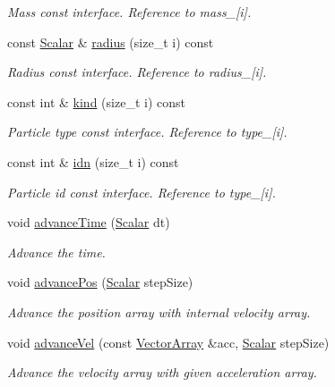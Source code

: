 \begin{DoxyCompactItemize}
\begin{DoxyCompactList}\small\item\em Mass const interface. Reference to mass\+\_\+\mbox{[}i\mbox{]}. \end{DoxyCompactList}\item 
const \mbox{\hyperlink{class_vel_indep_particles_a5d275b22f0d759f360ddd80e78f4b466}{Scalar}} \& \mbox{\hyperlink{class_vel_indep_particles_a99dc089a06437f5f382c2fb9aaf10859}{radius}} (size\+\_\+t i) const
\begin{DoxyCompactList}\small\item\em Radius const interface. Reference to radius\+\_\+\mbox{[}i\mbox{]}. \end{DoxyCompactList}\item 
const int \& \mbox{\hyperlink{class_vel_indep_particles_abc89cea5ae508c4edaf4d7a62256e355}{kind}} (size\+\_\+t i) const
\begin{DoxyCompactList}\small\item\em Particle type const interface. Reference to type\+\_\+\mbox{[}i\mbox{]}. \end{DoxyCompactList}\item 
const int \& \mbox{\hyperlink{class_vel_indep_particles_a9ab4c300244e1085dcfc73713354060c}{idn}} (size\+\_\+t i) const
\begin{DoxyCompactList}\small\item\em Particle id const interface. Reference to type\+\_\+\mbox{[}i\mbox{]}. \end{DoxyCompactList}\item 
void \mbox{\hyperlink{class_vel_indep_particles_a024d302cca3027451619a9346ecc24a4}{advance\+Time}} (\mbox{\hyperlink{class_vel_indep_particles_a5d275b22f0d759f360ddd80e78f4b466}{Scalar}} dt)
\begin{DoxyCompactList}\small\item\em Advance the time. \end{DoxyCompactList}\item 
void \mbox{\hyperlink{class_vel_indep_particles_aff530f9e2dbd6dc053e251caa07464ad}{advance\+Pos}} (\mbox{\hyperlink{class_vel_indep_particles_a5d275b22f0d759f360ddd80e78f4b466}{Scalar}} step\+Size)
\begin{DoxyCompactList}\small\item\em Advance the position array with internal velocity array. \end{DoxyCompactList}\item 
void \mbox{\hyperlink{class_vel_indep_particles_adb74d0445c84c0b705c25a8c50f6bc00}{advance\+Vel}} (const \mbox{\hyperlink{class_vel_indep_particles_a27580f65b6523bfb6900520af2e44708}{Vector\+Array}} \&acc, \mbox{\hyperlink{class_vel_indep_particles_a5d275b22f0d759f360ddd80e78f4b466}{Scalar}} step\+Size)
\begin{DoxyCompactList}\small\item\em Advance the velocity array with given acceleration array. \end{DoxyCompactList}\end{DoxyCompactItemize}
